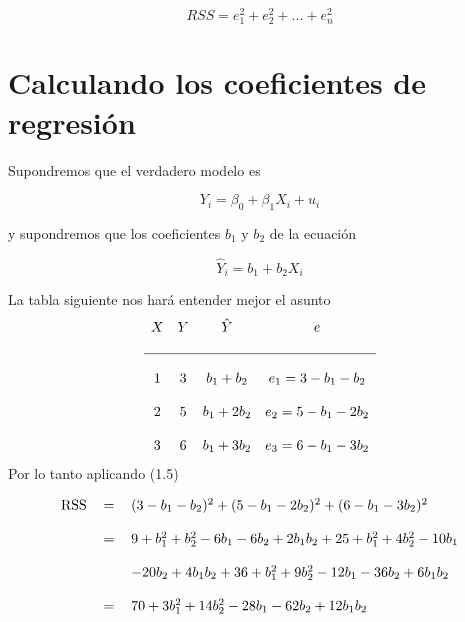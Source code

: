 \begin{multicols}{2}
\begin{tcolorbox}[colframe = white]
    \begin{equation}
	RSS = e_1^2 + e_2^2 + ... + e_n^2
    \end{equation}
\end{tcolorbox}

\section{Calculando los coeficientes de regresión}
Supondremos que el verdadero modelo es
\begin{tcolorbox}[colframe = white]
    \begin{equation}
	Y_i = \beta_0 + \beta_1 X_i + u_i 
    \end{equation}
\end{tcolorbox}
y supondremos que los coeficientes $b_1$ y $b_2$ de la ecuación 
\begin{tcolorbox}[colframe = white]
    \begin{equation}
	\hat{Y}_i = b_1 + b_2 X_i
    \end{equation}
\end{tcolorbox}
La tabla siguiente nos hará entender mejor el asunto
$$\begin{array}{cccc}
    X&Y&\hat{Y}&e\\\\
    \hline\\
     1&3&b_1+b_2&e_1 = 3-b_1-b_2\\\\
     2&5&b_1+2b_2&e_2 = 5-b_1-2b_2\\\\
     3&6&b_1+3b_2&e_3 = 6-b_1-3b_2
\end{array}$$
Por lo tanto aplicando (1.5)

\begin{equation}
\begin{tabular}{rcl}
    RSS & = & $(3-b_1-b_2)^2 + (5-b_1-2b_2)^2 + (6-b_1-3b_2)^2$\\\\
	& = & $9+b_1^2 + b_2^2 - 6b_1 - 6b_2 + 2b_1b_2 + 25 + b_1^2 + 4b_2^2 - 10b_1$ \\\\
	&  & $- 20b_2 + 4b_1b_2 + 36 +b_1^2 + 9b_2^2 - 12b_1 - 36b_2 + 6b_1b_2 $\\\\
	& = &  $70 + 3b_1^2 + 14b_2^2 -28b_1 -62b_2 +12b_1b_2$\\
\end{tabular}
\end{equation}



\end{multicols}

